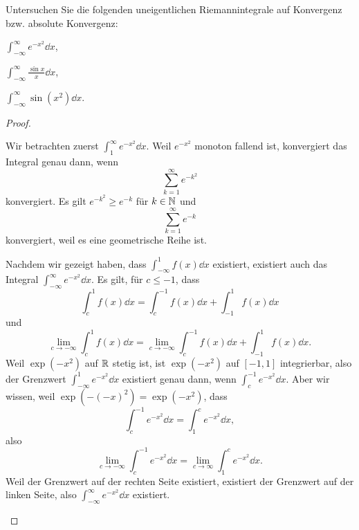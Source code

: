 \begin{Problem}
Untersuchen Sie die folgenden uneigentlichen Riemannintegrale auf Konvergenz bzw. absolute Konvergenz:
\begin{parts}
\item $\int_{-\infty}^\infty e^{-x^2}\dd{x}$,
\item $\int_{-\infty}^\infty \frac{\sin x}{x}\dd{x}$,
\item $\int_{-\infty}^\infty \sin\left( x^2 \right) \dd{x}$.
\end{parts}
\end{Problem}
\begin{proof}
	\begin{parts}
	\item Wir betrachten zuerst $\int_1^\infty e^{-x^2}\dd{x}$. Weil $e^{-x^2}$ monoton fallend ist, konvergiert das Integral genau dann, wenn
		\[
			\sum_{k=1}^\infty e^{-k^2}
		\]
		konvergiert. Es gilt $e^{-k^2}\ge e^{-k}$ f\"{u}r $k\in \mathbb{N}$ und
		\[
			\sum_{k=1}^\infty e^{-k}
		\]
		konvergiert, weil es eine geometrische Reihe ist. 

		Nachdem wir gezeigt haben, dass $\int_{-\infty}^{1}f(x)\dd{x}$ existiert, existiert auch das Integral $\int_{-\infty}^\infty e^{-x^2}\dd{x}$. Es gilt, f\"{u}r $c\le -1$, dass
		\[
			\int_{c}^1 f(x)\dd{x}=\int_{c}^{-1} f(x)\dd{x}+\int_{-1}^1 f(x)\dd{x}
		\]
		und
		\[
			\lim_{c \to -\infty} \int_c^1 f(x)\dd{x}=\lim_{c \to -\infty} \int_{c}^{-1}f(x)\dd{x}+\int_{-1}^1f(x)\dd{x}
		.\] 
		Weil $\exp(-x^2)$ auf $\mathbb{R}$ stetig ist, ist $\exp(-x^2)$ auf $[-1,1]$ integrierbar, also der Grenzwert $\int_{-\infty}^1 e^{-x^2}\dd{x}$ existiert genau dann, wenn $\int_c^{-1}e^{-x^2}\dd{x}$. Aber wir wissen, weil $\exp(-(-x)^2)=\exp(-x^2)$, dass
		\[
			\int_{c}^{-1}e^{-x^2}\dd{x}=\int_1^c e^{-x^2}\dd{x}
		,\] 
		also
		\[
			\lim_{c \to -\infty} \int_{c}^{-1}e^{-x^2}\dd{x}=\lim_{c \to \infty} \int_1^c e^{-x^2}\dd{x}
		.\] 
		Weil der Grenzwert auf der rechten Seite existiert, existiert der Grenzwert auf der linken Seite, also $\int_{-\infty}^\infty e^{-x^2}\dd{x}$ existiert.


\end{parts}
\end{proof}
